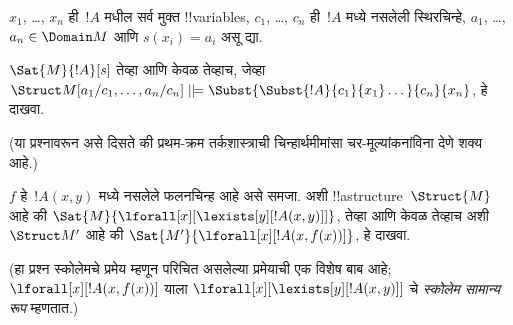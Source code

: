 \documentclass[../../../include/open-logic-section]{subfiles}
\begin{document}
\begin{prob}
\begin{enumerate}

\end{enumerate}
$x_1$, \dots, $x_n$ ही~$!A$ मधील सर्व मुक्त !!{variable}s,
$c_1$, \dots, $c_n$ ही~$!A$ मध्ये नसलेली स्थिरचिन्हे,
$a_1$, \dots, $a_n \in \Domain M$ आणि $s(x_i) = a_i$ असू द्या.

$\Sat{M}{!A}[s]$ तेव्हा आणि केवळ तेव्हाच, जेव्हा
$\Struct M[a_1/c_1,\dots,a_n/c_n]
\VDash \Subst{\Subst{!A}{c_1}{x_1}\dots}{c_n}{x_n}$, हे दाखवा.

(या प्रश्नावरून असे दिसते की प्रथम-क्रम तर्कशास्त्राची चिन्हार्थमीमांसा
चर-मूल्यांकनांविना देणे शक्य आहे.)
\end{prob}

\begin{prob}
$f$ हे~$!A(x,y)$ मध्ये नसलेले फलनचिन्ह आहे असे समजा. अशी
!!a{structure}~$\Struct{M}$ आहे की
$\Sat{M}{\lforall[x][\lexists[y][!A(x,y)]]}$, तेव्हा आणि केवळ तेव्हाच
अशी~$\Struct M'$ आहे की
$\Sat{M'}{\lforall[x][!A(x,f(x))]}$, हे दाखवा.

(हा प्रश्न स्कोलेमचे प्रमेय म्हणून परिचित असलेल्या प्रमेयाची एक विशेष
बाब आहे; $\lforall[x][!A(x,f(x))]$ याला
$\lforall[x][\lexists[y][!A(x,y)]]$ चे \emph{स्कोलेम सामान्य रूप}
म्हणतात.)
\end{prob}
\end{document}

